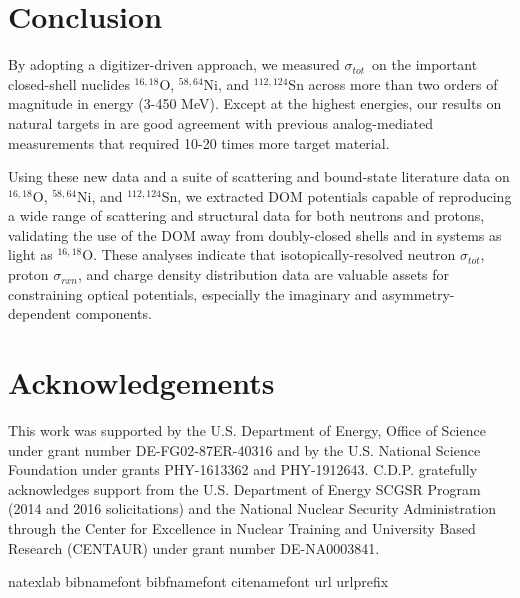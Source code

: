 \documentclass[twocolumn,secnumarabic,amssymb, nobibnotes, aps, prl,
superscriptaddress, nobalancelastpage]{revtex4}
\newcommand{\tot}{\ensuremath{\sigma_{tot}}}
\newcommand{\rxn}{\ensuremath{\sigma_{rxn}}}
\newcommand{\oSixEight}{\ensuremath{^{16,18}}O}
\newcommand{\niEightFour}{\ensuremath{^{58,64}}N\lowercase{i}}
\newcommand{\snTwelveFour}{\ensuremath{^{112,124}}S\lowercase{n}}
\begin{document}
\section{Conclusion}
By adopting a digitizer-driven
approach, we measured \tot\ on the important closed-shell nuclides
$^{16,18}$O, $^{58,64}$Ni, and $^{112,124}$Sn across more than two orders of
magnitude in energy (3-450 MeV). Except at the highest energies, our results
on natural targets in are good agreement with previous analog-mediated measurements
that required 10-20 times more target material. 

Using these new data and a suite of scattering and bound-state literature data
on \oSixEight, \niEightFour, and \snTwelveFour,
we extracted DOM potentials capable of reproducing a wide range of scattering
and structural data for both neutrons and protons, validating the use of the
DOM away from doubly-closed shells and in systems as light as \oSixEight.
These analyses indicate that isotopically-resolved neutron \tot,
proton \rxn, and charge density distribution data are valuable assets for
constraining optical potentials, especially the imaginary and
asymmetry-dependent components.

\section{Acknowledgements}
This work was supported by the U.S. Department of Energy, Office of Science under grant number
DE-FG02-87ER-40316 and by the U.S. National Science Foundation under grants
PHY-1613362 and PHY-1912643. C.D.P. gratefully acknowledges support from the
U.S. Department of Energy SCGSR Program (2014 and 2016 solicitations) and the
National Nuclear Security Administration through the Center for Excellence in Nuclear
Training and University Based Research (CENTAUR) under grant number DE-NA0003841.


\begin{thebibliography}{32} \expandafter\ifx\csname
        natexlab\endcsname\relax\def\natexlab#1{#1}\fi \expandafter\ifx\csname
        bibnamefont\endcsname\relax \def\bibnamefont#1{#1}\fi
        \expandafter\ifx\csname bibfnamefont\endcsname\relax
        \def\bibfnamefont#1{#1}\fi \expandafter\ifx\csname
        citenamefont\endcsname\relax \def\citenamefont#1{#1}\fi
        \expandafter\ifx\csname url\endcsname\relax \def\url#1{\texttt{#1}}\fi
        \expandafter\ifx\csname urlprefix\endcsname\relax\def\urlprefix{URL
        }\fi \providecommand{\bibinfo}[2]{#2}
        \providecommand{\eprint}[2][]{\url{#2}}

\end{thebibliography}
\end{document}
